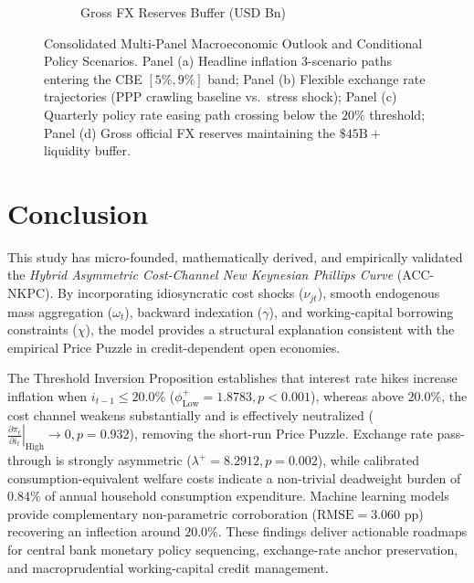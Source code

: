 \documentclass[review,12pt]{elsarticle}
\begin{document}
\begin{figure}[H]
\begin{subfigure}[b]{0.48\textwidth}
\caption{Gross FX Reserves Buffer (USD Bn)}
\end{subfigure}
\caption{Consolidated Multi-Panel Macroeconomic Outlook and Conditional Policy Scenarios.
Panel (a) Headline inflation 3-scenario paths entering the CBE $[5\%,9\%]$ band;
Panel (b) Flexible exchange rate trajectories (PPP crawling baseline vs.\ stress shock); Panel (c) Quarterly policy rate easing path crossing below the $20\%$ threshold;
Panel (d) Gross official FX reserves maintaining the $\$45\text{B}+$ liquidity buffer.}
\label{fig:multi_panel_forecast}
\end{figure}

\section{Conclusion}
\label{sec:conclusion}

This study has micro-founded, mathematically derived, and empirically validated the
\textit{Hybrid Asymmetric Cost-Channel New Keynesian Phillips Curve} (ACC-NKPC). By
incorporating idiosyncratic cost shocks ($\nu_{jt}$), smooth endogenous mass aggregation
($\omega_t$), backward indexation ($\gamma$), and working-capital borrowing constraints ($\chi$),
the model provides a structural explanation consistent with the empirical Price Puzzle in credit-dependent open economies.

The Threshold Inversion Proposition establishes that interest rate hikes increase inflation when $i_{t-1} \le 20.0\%$ ($\phi_{\text{Low}}^{+} = 1.8783, p < 0.001$), whereas above $20.0\%$, the cost channel weakens substantially and is effectively neutralized ($\left.\frac{\partial\pi_t}{\partial i_t}\right|_{\text{High}} \to 0, p = 0.932$), removing the short-run Price Puzzle. Exchange rate pass-through is strongly asymmetric ($\lambda^{+} = 8.2912, p = 0.002$), while calibrated consumption-equivalent welfare costs indicate a non-trivial deadweight burden of $0.84\%$ of annual household consumption expenditure. Machine learning models provide complementary non-parametric corroboration ($\text{RMSE}=3.060\text{ pp}$) recovering an inflection around $20.0\%$. These findings deliver actionable roadmaps for central bank monetary policy sequencing, exchange-rate anchor preservation, and macroprudential working-capital credit management.
\end{document}
